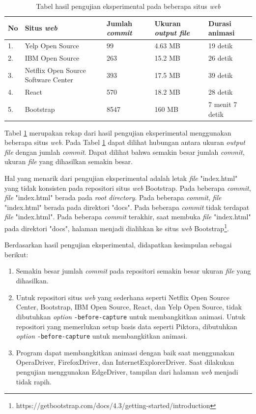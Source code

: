 \begin{table}[htbp]
	\centering
	\caption{Tabel hasil pengujian eksperimental pada beberapa situs \textit{web}}
	
		\begin{tabular}{|p{0.3cm}| p{5 cm}| p{3 cm }|p{3 cm}| p{3 cm}|} \hline
		No & Situs \textit{web}	& Jumlah \textit{commit} &Ukuran \textit{output file}  & Durasi animasi \\ \hline
		1. & Yelp Open Source & 99 &4.63 MB  & 19 detik\\ \hline
		2. & IBM Open Source & 263&15.2 MB  & 26 detik	\\ \hline	
		3. & Netflix Open Source Software Center & 393 &17.5 MB & 39 detik  \\ \hline
		4. & React & 570 & 18.2 MB  & 28 detik \\ \hline
		5. & Bootstrap & 8547 &160 MB & 7 menit 7 detik  \\ \hline
		\end{tabular}
	\label{table:hasil_eksperimental}
\end{table}

Tabel \ref{table:hasil_eksperimental} merupakan rekap dari hasil pengujian eksperimental menggunakan beberapa situs \textit{web}. Pada Tabel \ref{table:hasil_eksperimental} dapat dilihat hubungan antara ukuran \textit{output file} dengan jumlah \textit{commit}. Dapat dilihat bahwa semakin besar jumlah \textit{commit}, ukuran \textit{file} yang dihasilkan semakin besar.

Hal yang menarik dari pengujian eksperimental adalah letak \textit{file} "index.html" yang tidak konsisten pada repositori situs \textit{web} Bootstrap. Pada beberapa \textit{commit}, \textit{file} "index.html" berada pada \textit{root directory}. Pada beberapa \textit{commit}, \textit{file} "index.html" berada pada direktori "docs". Pada beberapa \textit{commit} tidak terdapat \textit{file} "index.html". Pada beberapa \textit{commit} terakhir, saat membuka \textit{file} "index.html" pada direktori "docs", halaman menjadi dialihkan ke situs \textit{web} Bootstrap\footnote{https://getbootstrap.com/docs/4.3/getting-started/introduction}.


Berdasarkan hasil pengujian eksperimental, didapatkan kesimpulan sebagai berikut:
\begin{enumerate}
\item Semakin besar jumlah \textit{commit} pada repositori semakin besar ukuran \textit{file} yang dihasilkan.
\item Untuk repositori situs \textit{web} yang sederhana seperti Netflix Open Source Center, Bootstrap, IBM Open Source, React, dan Yelp Open Source, tidak dibutuhkan \textit{option} \texttt{-before-capture} untuk membangkitkan animasi. Untuk repositori yang memerlukan setup basis data seperti Piktora, dibutuhkan \textit{option} \texttt{-before-capture} untuk membangkitkan animasi. 
\item Program dapat membangkitkan animasi dengan baik saat menggunakan OperaDriver, FirefoxDriver, dan InternetExplorerDriver. Saat dilakukan pengujian menggunakan EdgeDriver, tampilan dari halaman \textit{web} menjadi tidak rapih.
\end{enumerate}

